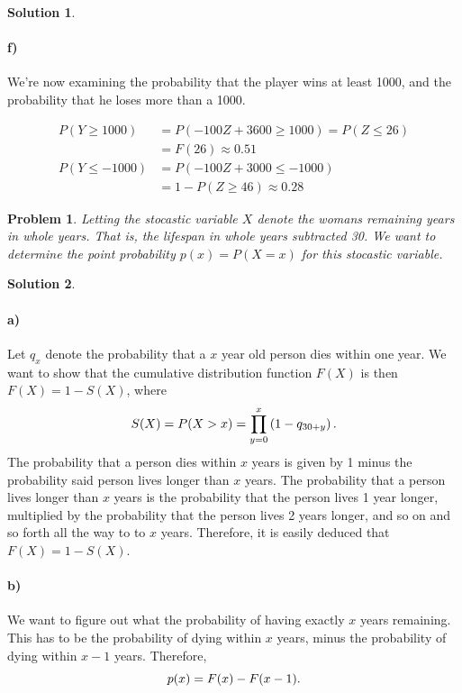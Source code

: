 \documentclass[a4paper]{article}
\newtheorem{prb}{Problem}
\theoremstyle{definition}
\newtheorem{sol}{Solution}
\begin{document}
\begin{sol}
\paragraph{f)}

We're now examining the probability that the player wins at least 1000, and the
probability that he loses more than a 1000.

\begin{align*}
  P(Y \geq 1000) &= P(-100Z + 3600 \geq 1000) = P(Z \leq 26) \\
  &= F(26) \approx 0.51 \\
  P(Y \leq -1000) &= P(-100Z + 3000 \leq -1000) \\
  &= 1 - P(Z \geq 46) \approx 0.28
\end{align*}
\end{sol}

\begin{prb}
  Letting the stocastic variable $X$ denote the womans remaining years in whole
  years. That is, the lifespan in whole years subtracted 30. We want to
  determine the point probability $p(x) = P(X = x)$ for this stocastic
  variable.
\end{prb}

\begin{sol}
\item\paragraph{a)}
  Let $q_x$ denote the probability that a $x$ year old person dies within one year.
  We want to show that the cumulative distribution function $F(X)$ is then $F(X) = 1 - S(X)$,
  where
  \begin{equation}
    \notag 
    S(X) = P(X > x) = \prod\limits_{y=0}^{x} \left( 1 - q_{30+y} \right).
  \end{equation}
  The probability that a person dies within $x$ years is given by 1 minus the
  probability said person lives longer than $x$ years.  The probability that a
  person lives longer than $x$ years is the probability that the person lives 1
  year longer, multiplied by the probability that the person lives 2 years
  longer, and so on and so forth all the way to to $x$ years.  Therefore, it is
  easily deduced that $F(X) = 1 - S(X)$.

\paragraph{b)}
We want to figure out what the probability of having exactly $x$ years remaining.
This has to be the probability of dying within $x$ years, minus the probability of dying within $x-1$ years.
Therefore,
\begin{equation}
  \notag
  p(x) = F(x) - F(x-1).
\end{equation}
\end{sol}
\end{document}
